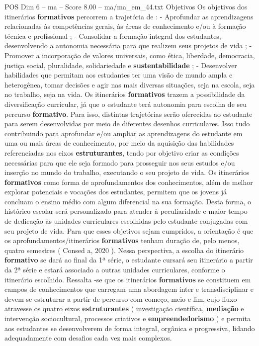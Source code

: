 \begin{textsample}{POS Dim 6 – ma – Score 8.00 – ma/ma\_em\_44.txt}
Objetivos Os objetivos dos itinerários \textbf{formativos} percorrem a trajetória de : - Aprofundar as aprendizagens relacionadas às competências gerais, às áreas de conhecimento e/ou à formação técnica e profissional ; - Consolidar a formação integral dos estudantes, desenvolvendo a autonomia necessária para que realizem seus projetos de vida ; - Promover a incorporação de valores universais, como ética, liberdade, democracia, justiça social, pluralidade, solidariedade e \textbf{sustentabilidade} ; - Desenvolver habilidades que permitam aos estudantes ter uma visão de mundo ampla e heterogênea, tomar decisões e agir nas mais diversas situações, seja na escola, seja no trabalho, seja na vida.
Os itinerários \textbf{formativos} trazem a possibilidade da diversificação curricular, já que o estudante terá autonomia para escolha de seu percurso \textbf{formativo}.
Para isso, distintas trajetórias serão oferecidas ao estudante para serem desenvolvidas por meio de diferentes desenhos curriculares.
Isso tudo contribuindo para aprofundar e/ou ampliar as aprendizagens do estudante em uma ou mais áreas de conhecimento, por meio da aquisição das habilidades referenciadas nos eixos \textbf{estruturantes}, tendo por objetivo criar as condições necessárias para que ele seja formado para prosseguir nos seus estudos e/ou inserção no mundo do trabalho, executando o seu projeto de vida.
Os itinerários \textbf{formativos} como forma de aprofundamentos dos conhecimentos, além de melhor explorar potenciais e vocações dos estudantes, permitem que os jovens já concluam o ensino médio com algum diferencial na sua formação.
Desta forma, o histórico escolar será personalizado para atender à peculiaridade e maior tempo de dedicação às unidades curriculares escolhidas pelo estudante conjugadas com seu projeto de vida.
Para que esses objetivos sejam cumpridos, a orientação é que os aprofundamentos/itinerários \textbf{formativos} tenham duração de, pelo menos, quatro semestres ( Consed a, 2020 ).
Nessa perspectiva, a escolha do itinerário \textbf{formativo} se dará ao final da 1ª série, o estudante cursará seu itinerário a partir da 2ª série e estará associado a outras unidades curriculares, conforme o itinerário escolhido.
Ressalta -se que os itinerários \textbf{formativos} se constituem em campos de conhecimentos que carregam uma abordagem inter e transdisciplinar e devem se estruturar a partir de percurso com começo, meio e fim, cujo fluxo atravesse os quatro eixos \textbf{estruturantes} ( investigação científica, \textbf{mediação} e intervenção sociocultural, processos criativos e \textbf{empreendedorismo} ) e permita aos estudantes se desenvolverem de forma integral, orgânica e progressiva, lidando adequadamente com desafios cada vez mais complexos.

\end{textsample}
